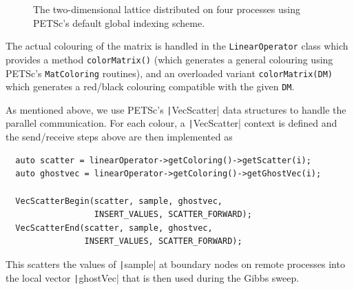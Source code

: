 \documentclass[
fontsize=11pt,
paper=a4,
numbers=noenddot
]{scrartcl}
\begin{document}
\begin{figure}[htbp]
    \caption{The two-dimensional lattice distributed on four processes using PETSc's default global indexing scheme.}\label{fig:latticedist}
\end{figure}

The actual colouring of the matrix is handled in the \texttt{LinearOperator} class which provides a method \texttt{colorMatrix()} (which generates a general colouring using PETSc's \texttt{MatColoring} routines), and an overloaded variant \texttt{colorMatrix(DM)} which generates a red/black colouring compatible with the given \texttt{DM}.

As mentioned above, we use PETSc's \texttt|VecScatter| data structures to handle the parallel communication. For each colour, a \texttt|VecScatter| context is defined and the send/receive steps above are then implemented as
\begin{verbatim}
  auto scatter = linearOperator->getColoring()->getScatter(i);
  auto ghostvec = linearOperator->getColoring()->getGhostVec(i);

  VecScatterBegin(scatter, sample, ghostvec, 
                  INSERT_VALUES, SCATTER_FORWARD);
  VecScatterEnd(scatter, sample, ghostvec, 
                INSERT_VALUES, SCATTER_FORWARD);
\end{verbatim}
This scatters the values of \texttt|sample| at boundary nodes on remote processes into the local vector \texttt|ghostVec| that is then used during the Gibbs sweep.
\end{document}
